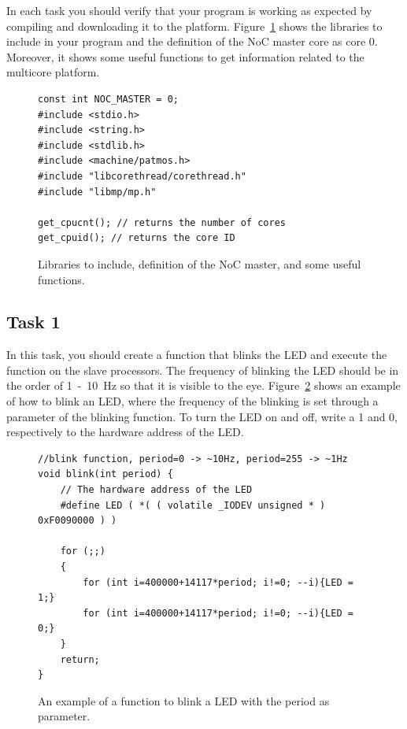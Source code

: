 \documentclass[a4paper,fontsize=10pt,twoside,DIV15,BCOR12mm,headinclude=true,footinclude=false,pagesize,bibtotoc]{scrbook}
\begin{document}
\noindent In each task you should verify that your program is working as expected by compiling and downloading it to the platform.
Figure~\ref{fig:header} shows the libraries to include in your program and the definition of the NoC master core as core 0.
Moreover, it shows some useful functions to get information related to the multicore platform.

\begin{figure}
\begin{Verbatim}[xleftmargin=1cm,xrightmargin=1cm,frame=single,framesep=3mm]
const int NOC_MASTER = 0;
#include <stdio.h>
#include <string.h>
#include <stdlib.h>
#include <machine/patmos.h>
#include "libcorethread/corethread.h"
#include "libmp/mp.h"

get_cpucnt(); // returns the number of cores
get_cpuid(); // returns the core ID
\end{Verbatim}
\caption{\label{fig:header}Libraries to include, definition of the NoC master, and some useful functions.}
\end{figure}

\subsection{Task 1}
In this task, you should create a function that blinks the LED and execute the function on the slave processors.
The frequency of blinking the LED should be in the order of 1~-~10~Hz so that it is visible to the eye.
Figure~\ref{fig:ctrl_led} shows an example of how to blink an LED, where the frequency of the blinking is set through a parameter of the blinking function.
To turn the LED on and off, write a 1 and 0, respectively to the hardware address of the LED. 

\begin{figure}
\begin{Verbatim}[xleftmargin=1cm,xrightmargin=1cm,frame=single,framesep=3mm]
//blink function, period=0 -> ~10Hz, period=255 -> ~1Hz
void blink(int period) {
    // The hardware address of the LED
    #define LED ( *( ( volatile _IODEV unsigned * ) 0xF0090000 ) )

    for (;;)
    {
        for (int i=400000+14117*period; i!=0; --i){LED = 1;}
        for (int i=400000+14117*period; i!=0; --i){LED = 0;}
    }
    return;
}
\end{Verbatim}
\caption{\label{fig:ctrl_led}An example of a function to blink a LED with the period as parameter.}
\end{figure}
\end{document}
